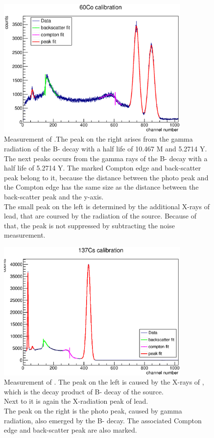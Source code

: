 \documentclass{article}
\begin{document}
\begin{figure}[H]
       \centering
        \includegraphics[width=0.85\textwidth]{Graphen/calibrate/uncalib_spectra/60Co.eps}
        \caption{Measurement of .The peak on the right arises from the gamma radiation of the B- decay with a half life of 10.467 M and 5.2714 Y.\\ 
        The next peaks occurs from the gamma rays of the B- decay with a half life of 5.2714 Y. The marked Compton edge and back-scatter peak belong to it, because the distance between the photo peak and the Compton edge has the same size as the distance between the back-scatter peak and the y-axis.\\
        The small peak on the left is determined by the additional X-rays of lead, that are coursed by the radiation of the source. Because of that, the peak is not suppressed by subtracting the noise measurement. }
\end{figure}
\begin{figure}[H]
       \centering
        \includegraphics[width=0.85\textwidth]{Graphen/calibrate/uncalib_spectra/137Cs.eps}
        \caption{Measurement of . The peak on the left is caused by the X-rays of , which is the decay product of B- decay of the source.\\
        Next to it is again the X-radiation peak of lead.\\
        The peak on the right is the photo peak, caused by gamma radiation, also emerged by the B- decay. The associated Compton edge and back-scatter peak are also marked. }
\end{figure}
\end{document}
